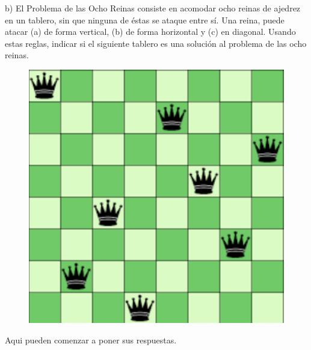 \newpage
\Large
b) El Problema de las Ocho Reinas consiste en acomodar ocho reinas de ajedrez en un tablero, sin que ninguna de éstas se ataque entre sí. Una reina, puede atacar (a) de forma vertical, (b) de forma horizontal y (c) en diagonal. Usando estas reglas, indicar si el siguiente tablero es una solución al problema de las ocho reinas.\\

\begin{figure}[h!]
\centering
\includegraphics[scale=0.35]{Tablero.png}
\end{figure}
\large
Aqui pueden comenzar a poner sus respuestas.\\